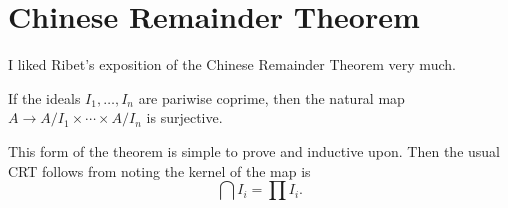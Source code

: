 \section{Chinese Remainder Theorem}
I liked Ribet's exposition of the Chinese Remainder Theorem very much.
\begin{thm}
    If the ideals $I_1, \dots, I_n$ are pariwise coprime, then the natural map $A \rightarrow A/I_1 \times \cdots \times A/I_n$ is surjective.
\end{thm}
This form of the theorem is simple to prove and inductive upon. Then the usual CRT follows from noting the kernel of the map is
\[
    \bigcap I_i = \prod I_i.
\]
